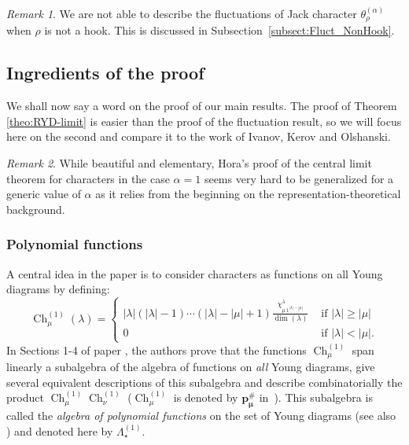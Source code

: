 \documentclass[11pt]{amsart}
\theoremstyle{plain}
\theoremstyle{remark}
\newtheorem*{remark}{Remark}
\newcommand{\Polun}{\Lambda_\star^{(1)}}
\DeclareMathOperator{\Ch}{Ch}
\begin{document}
\begin{remark}\label{rem:Fluct_NonHook}
We are not able to describe the fluctuations of 
Jack character $\theta^{(\alpha)}_\rho$
when $\rho$ is not a hook.
This is discussed in Subsection~\ref{subsect:Fluct_NonHook}.
\end{remark}


\subsection{Ingredients of the proof}

We shall now say a word on the proof of our main results.
The proof of Theorem \ref{theo:RYD-limit} is easier than
the proof of the fluctuation result, so we will focus here on the second
and compare it to the work of Ivanov, Kerov and Olshanski.

\begin{remark}
While beautiful and elementary, Hora's proof of the central limit theorem
for characters in the case $\alpha=1$ seems very hard to be generalized for 
a generic value of $\alpha$ as it relies from the beginning
on the representation-theoretical background.
\end{remark}

\subsubsection{Polynomial functions}
A central idea in the paper \cite{IvanovOlshanski2002} is to consider 
characters as functions on all Young diagrams by defining:
\[\Ch_{\mu}^{(1)}(\lambda)=
\begin{cases}
    |\lambda|(|\lambda|-1)\cdots (|\lambda|-|\mu|+1) \frac{\chi^\lambda_{\mu\, 1^{|\lambda|-|\mu|}}}
    {\dim(\lambda)} &\text{ if }|\lambda| \ge |\mu|\\
    0 &\text{ if }|\lambda| < |\mu|.
\end{cases}\]
In Sections 1-4 of paper \cite{IvanovOlshanski2002},
the authors prove that the functions $\Ch_{\mu}^{(1)}$ span linearly
a subalgebra of the algebra of functions on {\em all} Young diagrams,
give several equivalent descriptions of this subalgebra
and describe combinatorially the product $\Ch_{\mu}^{(1)} \Ch_{\nu}^{(1)}$
($\Ch_{\mu}^{(1)}$ is denoted by $\bm{p^\#_\mu}$ in~\cite{IvanovOlshanski2002}).
This subalgebra is called the \emph{algebra of
polynomial functions} on the set of Young diagrams (see also \cite{KerovOlshanskiPolFunc})
and denoted here by $\Polun$.
\end{document}
